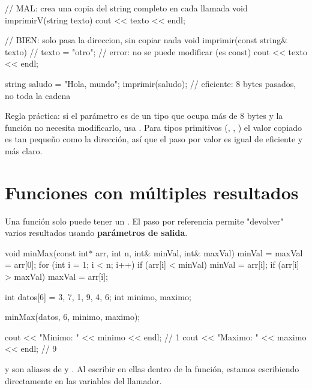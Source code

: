 \documentclass[12pt, oneside]{article}
\begin{document}
\begin{codigo}[caption={const\& para evitar copias costosas}]
// MAL: crea una copia del string completo en cada llamada
void imprimirV(string texto) {
    cout << texto << endl;
}

// BIEN: solo pasa la direccion, sin copiar nada
void imprimir(const string& texto) {
    // texto = "otro";  // error: no se puede modificar (es const)
    cout << texto << endl;
}

string saludo = "Hola, mundo";
imprimir(saludo);   // eficiente: 8 bytes pasados, no toda la cadena
\end{codigo}

\begin{consejo}
  Regla práctica: si el parámetro es de un tipo que ocupa más de 8 bytes
  y la función no necesita modificarlo, usa . Para tipos
  primitivos (, , ) el valor copiado es tan
  pequeño como la dirección, así que el paso por valor es igual de eficiente
  y más claro.
\end{consejo}

\section{Funciones con múltiples resultados}

Una función solo puede tener un . El paso por referencia permite
"devolver" varios resultados usando \textbf{parámetros de salida}.

\begin{codigo}[caption={Mínimo y máximo de un arreglo en una sola pasada}]
void minMax(const int* arr, int n, int& minVal, int& maxVal) {
    minVal = maxVal = arr[0];
    for (int i = 1; i < n; i++) {
        if (arr[i] < minVal) minVal = arr[i];
        if (arr[i] > maxVal) maxVal = arr[i];
    }
}

int datos[6] = {3, 7, 1, 9, 4, 6};
int minimo, maximo;

minMax(datos, 6, minimo, maximo);

cout << "Minimo: " << minimo << endl;  // 1
cout << "Maximo: " << maximo << endl;  // 9
\end{codigo}

 y  son aliases de  y . Al escribir
en ellas dentro de la función, estamos escribiendo directamente en las variables del llamador.
\end{document}
